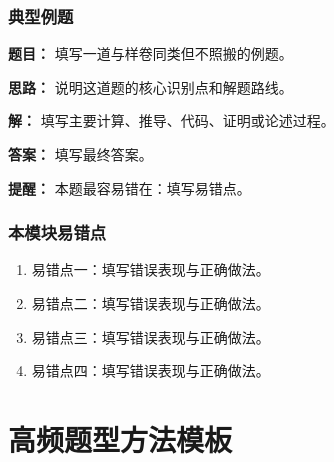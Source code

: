 \documentclass[UTF8,zihao=-4]{ctexart}
\begin{document}
\subsubsection{典型例题}

\begin{examplebox}[典型例题]
\textbf{题目：}
填写一道与样卷同类但不照搬的例题。\par

\textbf{思路：}
说明这道题的核心识别点和解题路线。\par

\textbf{解：}
填写主要计算、推导、代码、证明或论述过程。\par

\textbf{答案：}
填写最终答案。\par

\textbf{提醒：}
本题最容易错在：填写易错点。
\end{examplebox}

\subsubsection{本模块易错点}

\begin{warnbox}[本模块易错点]
\begin{enumerate}
  \item 易错点一：填写错误表现与正确做法。
  \item 易错点二：填写错误表现与正确做法。
  \item 易错点三：填写错误表现与正确做法。
  \item 易错点四：填写错误表现与正确做法。
\end{enumerate}
\end{warnbox}

\section{高频题型方法模板}
\end{document}
